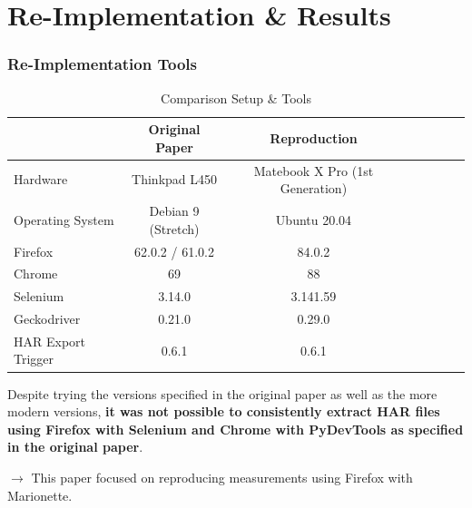 \section{Re-Implementation \& Results}

\begin{frame}
    \frametitle{Re-Implementation Tools}
	\begin{table}
		\centering
		\caption{Comparison Setup \& Tools}
		\label{tab:tools}
		\begin{tabular}{lccccccc}
			\toprule
			& \textbf{Original Paper} & \textbf{Reproduction}\\
			\midrule
			Hardware & Thinkpad L450 & Matebook X Pro (1st Generation)\\
			Operating System & Debian 9 (Stretch) & Ubuntu 20.04\\
			Firefox & 62.0.2 / 61.0.2 & 84.0.2 \\
			Chrome & 69 & 88 \\
			Selenium & 3.14.0 & 3.141.59\\
			Geckodriver & 0.21.0 & 0.29.0\\
			HAR Export Trigger & 0.6.1 & 0.6.1\\
			\bottomrule
		\end{tabular}
	\end{table}
	
Despite trying the versions specified in the original paper as well as the more modern versions, \textbf{it was not possible to consistently extract HAR files using Firefox with Selenium and Chrome with PyDevTools as specified in the original paper}.

$\boldsymbol{\rightarrow}$  This paper focused on reproducing measurements using Firefox with Marionette.
\end{frame}

